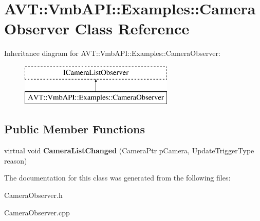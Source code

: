 \hypertarget{class_a_v_t_1_1_vmb_a_p_i_1_1_examples_1_1_camera_observer}{}\section{A\+VT\+:\+:Vmb\+A\+PI\+:\+:Examples\+:\+:Camera\+Observer Class Reference}
\label{class_a_v_t_1_1_vmb_a_p_i_1_1_examples_1_1_camera_observer}
Inheritance diagram for A\+VT\+:\+:Vmb\+A\+PI\+:\+:Examples\+:\+:Camera\+Observer\+:\begin{figure}[H]
\begin{center}
\leavevmode
\includegraphics[height=2.000000cm]{class_a_v_t_1_1_vmb_a_p_i_1_1_examples_1_1_camera_observer}
\end{center}
\end{figure}
\subsection*{Public Member Functions}
\begin{DoxyCompactItemize}
\item 
\mbox{\label{class_a_v_t_1_1_vmb_a_p_i_1_1_examples_1_1_camera_observer_af9ed70bae9b1477e177c5638a413247c}} 
virtual void {\bfseries Camera\+List\+Changed} (Camera\+Ptr p\+Camera, Update\+Trigger\+Type reason)
\end{DoxyCompactItemize}


The documentation for this class was generated from the following files\+:\begin{DoxyCompactItemize}
\item 
Camera\+Observer.\+h\item 
Camera\+Observer.\+cpp\end{DoxyCompactItemize}
